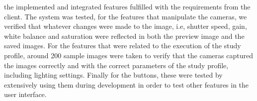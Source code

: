 the implemented and integrated features fulfilled with the requirements from the client. The system was tested, for the features that manipulate the cameras, we verified that whatever changes were made to the image, i.e, shutter speed, gain, white balance and saturation were reflected in both the preview image and the saved images. For the features that were related to the execution of the study profile, around 200 sample images were taken to verify that the cameras captured the images correctly and with the correct parameters of the study profile, including lighting settings. Finally for the buttons, these were tested by extensively using them during development in order to test other features in the user interface.